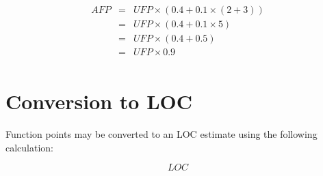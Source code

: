 \documentclass[11pt]{article}
\begin{document}
\begin{eqnarray}
  AFP & = & UFP \times (0.4 + 0.1 \times (2 + 3)) \\
      & = & UFP \times (0.4 + 0.1 \times 5) \\
      & = & UFP \times (0.4 + 0.5) \\
      & = & UFP \times 0.9 \\
\end{eqnarray}

\section{Conversion to LOC}
Function points may be converted to an LOC estimate using the following calculation:

\begin{equation}
  LOC
\end{equation}
\end{document}
